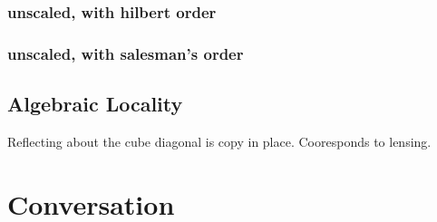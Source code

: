 \documentclass[letterpaper,twocolumn,amsmath,amsfont,amssymb,english,aps,jcp,preprintnumbers,groupaddress,nofootinbib,tightenlines]{revtex4}
\begin{document}
\subsubsection{unscaled, with hilbert order}

\subsubsection{unscaled, with salesman's order}

\subsection{Algebraic  Locality}

Reflecting about the cube diagonal is copy in place.  Cooresponds to lensing.


\section{Conversation}



\end{document}
